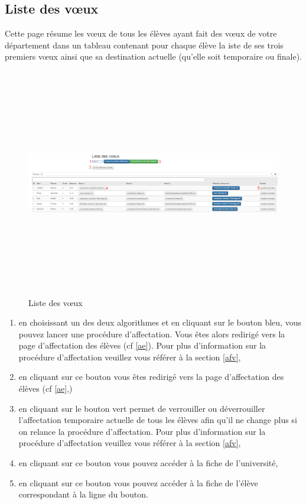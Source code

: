    \subsection{Liste des vœux}
   \label{lv}
   Cette page résume les vœux de tous les élèves ayant fait des vœux de votre département dans un tableau contenant pour chaque élève la iste de ses trois premiers vœux ainsi que sa destination actuelle (qu'elle soit temporaire ou finale).
   \begin{figure}[H]
   	\centering
   	\includegraphics[width=18cm,height=10cm]{Images/Admin/liste_voeux_admin.png}
   	\caption{Liste des vœux} 	
   \end{figure}
   \begin{enumerate}
   	\item en choisissant un des deux algorithmes et en cliquant sur le bouton bleu, vous pouvez lancer une procédure d'affectation. Vous êtes alors redirigé vers la page d'affectation des élèves (cf \ref{ae}). Pour plus d'information sur la procédure d'affectation veuillez vous référer à la section \ref{afv},
   	\item en cliquant sur ce bouton vous êtes redirigé vers la page d'affectation des élèves (cf \ref{ae},)
   	\item en cliquant sur le bouton vert permet de verrouiller ou déverrouiller l'affectation temporaire actuelle de tous les élèves afin qu'il ne change plus si on relance la procédure d'affectation. Pour plus d'information sur la procédure d'affectation veuillez vous référer à la section \ref{afv},
   	\item en cliquant sur ce bouton vous pouvez accéder à la fiche de l'université,
   	\item en cliquant sur ce bouton vous pouvez accéder à la fiche de l'élève correspondant à la ligne du bouton.
	\end{enumerate}
   
